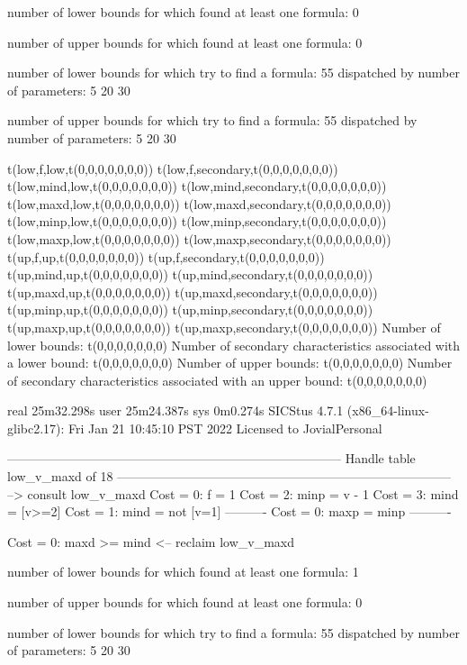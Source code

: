 number of lower bounds for which found at least one formula: 0

number of upper bounds for which found at least one formula: 0

number of lower bounds for which try to find a formula: 55
dispatched by number of parameters: 5  20  30

number of upper bounds for which try to find a formula: 55
dispatched by number of parameters: 5  20  30

t(low,f,low,t(0,0,0,0,0,0,0))
t(low,f,secondary,t(0,0,0,0,0,0,0))
t(low,mind,low,t(0,0,0,0,0,0,0))
t(low,mind,secondary,t(0,0,0,0,0,0,0))
t(low,maxd,low,t(0,0,0,0,0,0,0))
t(low,maxd,secondary,t(0,0,0,0,0,0,0))
t(low,minp,low,t(0,0,0,0,0,0,0))
t(low,minp,secondary,t(0,0,0,0,0,0,0))
t(low,maxp,low,t(0,0,0,0,0,0,0))
t(low,maxp,secondary,t(0,0,0,0,0,0,0))
t(up,f,up,t(0,0,0,0,0,0,0))
t(up,f,secondary,t(0,0,0,0,0,0,0))
t(up,mind,up,t(0,0,0,0,0,0,0))
t(up,mind,secondary,t(0,0,0,0,0,0,0))
t(up,maxd,up,t(0,0,0,0,0,0,0))
t(up,maxd,secondary,t(0,0,0,0,0,0,0))
t(up,minp,up,t(0,0,0,0,0,0,0))
t(up,minp,secondary,t(0,0,0,0,0,0,0))
t(up,maxp,up,t(0,0,0,0,0,0,0))
t(up,maxp,secondary,t(0,0,0,0,0,0,0))
Number of lower bounds:                                             t(0,0,0,0,0,0,0)
Number of secondary characteristics associated with a lower bound:  t(0,0,0,0,0,0,0)
Number of upper bounds:                                             t(0,0,0,0,0,0,0)
Number of secondary characteristics associated with an upper bound: t(0,0,0,0,0,0,0)

real	25m32.298s
user	25m24.387s
sys	0m0.274s
SICStus 4.7.1 (x86_64-linux-glibc2.17): Fri Jan 21 10:45:10 PST 2022
Licensed to JovialPersonal


--------------------------------------------------------------------------------
Handle table low_v_maxd of 18
--------------------------------------------------------------------------------
--> consult low_v_maxd
Cost =  0:  f    = 1
Cost =  2:  minp = v - 1
Cost =  3:  mind = [v>=2]
Cost =  1:  mind = not [v=1]
----------
Cost =  0:  maxp = minp
----------

Cost =  0:  maxd >= mind
<-- reclaim low_v_maxd

number of lower bounds for which found at least one formula: 1

number of upper bounds for which found at least one formula: 0

number of lower bounds for which try to find a formula: 55
dispatched by number of parameters: 5  20  30

